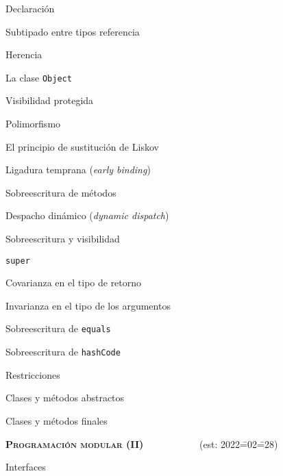 \begin{longenum}
\begin{longenum}
\begin{longenum}
            \item Declaración
            \item Subtipado entre tipos referencia
            \item Herencia
            \item La clase \texttt{Object}
            \item Visibilidad protegida
        \end{longenum}
        \item Polimorfismo
        \begin{longenum}
            \item El principio de sustitución de Liskov
            \begin{longenum}
                \item Ligadura temprana (\textit{early binding})
            \end{longenum}
            \item Sobreescritura de métodos
            \begin{longenum}
                \item Despacho dinámico (\textit{dynamic dispatch})
                \item Sobreescritura y visibilidad
                \item \texttt{super}
                \item Covarianza en el tipo de retorno
                \item Invarianza en el tipo de los argumentos
                \item Sobreescritura de \texttt{equals}
                \item Sobreescritura de \texttt{hashCode}
            \end{longenum}
        \end{longenum}
        \item Restricciones
        \begin{longenum}
            \item Clases y métodos abstractos
            \item Clases y métodos finales
        \end{longenum}
    \end{longenum}
    \item \textbf{\textsc{Programación modular (II)}} \ \ \ \ \ \ \ \ \ \ \ (est: 2022\==02\==28)
    \begin{longenum}
        \item Interfaces

\end{longenum}
\end{longenum}
